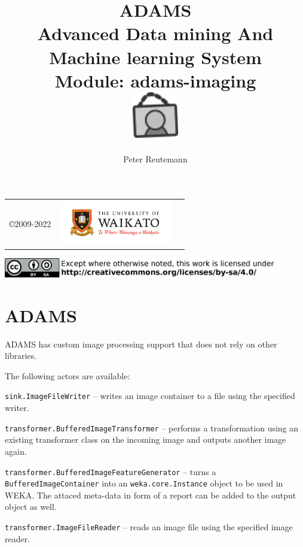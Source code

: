 \documentclass[a4paper]{book}
\title{
  \textbf{ADAMS} \\
  {\Large \textbf{A}dvanced \textbf{D}ata mining \textbf{A}nd \textbf{M}achine
  learning \textbf{S}ystem} \\
  {\Large Module: adams-imaging} \\
  \vspace{1cm}
  \includegraphics[width=2cm]{images/imaging-module.png} \\
}
\author{
  Peter Reutemann
}
\begin{document}
\begin{titlepage}
\maketitle

\thispagestyle{empty}
\center
\begin{table}[b]
	\begin{tabular}{c l l}
		\parbox[c][2cm]{2cm}{\copyright 2009-2022} &
		\parbox[c][2cm]{5cm}{\includegraphics[width=5cm]{images/coat_of_arms.pdf}} \\
	\end{tabular}
	\includegraphics[width=12cm]{images/cc.png} \\
\end{table}

\end{titlepage}

\tableofcontents
\listoffigures


\chapter{ADAMS}
ADAMS has custom image processing support that does not rely on other libraries.

The following actors are available:
\begin{tight_itemize}
	\item \texttt{sink.ImageFileWriter} -- writes an image container to a file
	using the specified writer.
	\item \texttt{transformer.BufferedImageTransformer} -- performs a transformation
	using an existing transformer class on the incoming image and
	outputs another image again.
	\item \texttt{transformer.BufferedImageFeatureGenerator} -- turns a
	\texttt{BufferedImageContainer} into an \texttt{weka.core.Instance} object to
	be used in WEKA. The attaced meta-data in form of a report can be added to the
	output object as well.
	\item \texttt{transformer.ImageFileReader} -- reads an image file using the
	specified image reader.
\end{tight_itemize}
\end{document}
